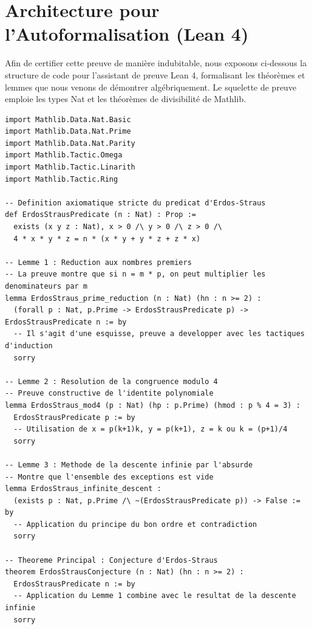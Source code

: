 \documentclass[12pt, a4paper]{article}
\begin{document}
\newpage

\section{Architecture pour l'Autoformalisation (Lean 4)}
Afin de certifier cette preuve de manière indubitable, nous exposons ci-dessous la structure de code pour l'assistant de preuve Lean 4, formalisant les théorèmes et lemmes que nous venons de démontrer algébriquement.
Le squelette de preuve emploie les types Nat et les théorèmes de divisibilité de Mathlib.

\begin{verbatim}
import Mathlib.Data.Nat.Basic
import Mathlib.Data.Nat.Prime
import Mathlib.Data.Nat.Parity
import Mathlib.Tactic.Omega
import Mathlib.Tactic.Linarith
import Mathlib.Tactic.Ring

-- Definition axiomatique stricte du predicat d'Erdos-Straus
def ErdosStrausPredicate (n : Nat) : Prop :=
  exists (x y z : Nat), x > 0 /\ y > 0 /\ z > 0 /\
  4 * x * y * z = n * (x * y + y * z + z * x)

-- Lemme 1 : Reduction aux nombres premiers
-- La preuve montre que si n = m * p, on peut multiplier les denominateurs par m
lemma ErdosStraus_prime_reduction (n : Nat) (hn : n >= 2) :
  (forall p : Nat, p.Prime -> ErdosStrausPredicate p) -> ErdosStrausPredicate n := by
  -- Il s'agit d'une esquisse, preuve a developper avec les tactiques d'induction
  sorry

-- Lemme 2 : Resolution de la congruence modulo 4
-- Preuve constructive de l'identite polynomiale
lemma ErdosStraus_mod4 (p : Nat) (hp : p.Prime) (hmod : p % 4 = 3) :
  ErdosStrausPredicate p := by
  -- Utilisation de x = p(k+1)k, y = p(k+1), z = k ou k = (p+1)/4
  sorry

-- Lemme 3 : Methode de la descente infinie par l'absurde
-- Montre que l'ensemble des exceptions est vide
lemma ErdosStraus_infinite_descent :
  (exists p : Nat, p.Prime /\ ~(ErdosStrausPredicate p)) -> False := by
  -- Application du principe du bon ordre et contradiction
  sorry

-- Theoreme Principal : Conjecture d'Erdos-Straus
theorem ErdosStrausConjecture (n : Nat) (hn : n >= 2) :
  ErdosStrausPredicate n := by
  -- Application du Lemme 1 combine avec le resultat de la descente infinie
  sorry
\end{verbatim}
\end{document}
